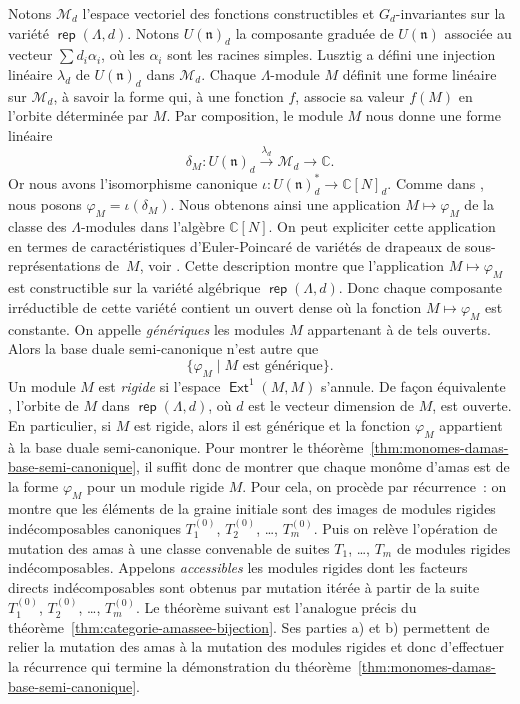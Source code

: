 \documentclass[brochure,12pt]{bourbaki}
\numberwithin{equation}{subsection}
\numberwithin{theorem}{section}
\newcommand{\opname}[1]{\operatorname{\mathsf{#1}}}
\newcommand{\rep}{\opname{rep}\nolimits}
\renewcommand{\rep}{\opname{rep}\nolimits}
\newcommand{\C}{\mathbb{C}}
\newcommand{\Ext}{\opname{Ext}}
\newcommand{\cm}{{\mathcal M}}
\renewcommand{\phi}{\varphi}
\newcommand{\arr}[1]{\stackrel{#1}{\rightarrow}}
\begin{document}
Notons $\cm_d$ l'espace vectoriel des fonctions constructibles et
$G_d$-invariantes sur la vari\'et\'e $\rep(\Lambda,d)$.  Notons
$U(\mathfrak{n})_d$ la composante gradu\'ee de $U(\mathfrak{n})$
associ\'ee au vecteur $\sum d_i \alpha_i$, o\`u les $\alpha_i$ sont
les racines simples.  Lusztig \cite{Lusztig00} a d\'efini une
injection lin\'eaire $\lambda_d$ de $U(\mathfrak{n})_d$ dans $\cm_d$.
Chaque $\Lambda$-module $M$ d\'efinit une forme lin\'eaire sur
$\cm_d$, \`a savoir la forme qui, \`a une fonction $f$, associe sa
valeur $f(M)$ en l'orbite d\'etermin\'ee par $M$. Par composition, le
module $M$ nous donne une forme lin\'eaire
\[
\delta_M: U(\mathfrak{n})_d \arr{\lambda_d} \cm_d \to \C.
\]
Or nous avons l'isomorphisme canonique $\iota : U(\mathfrak{n})_d^*
\to \C[N]_d$. Comme dans \cite{GeissLeclercSchroeer06}, nous posons
$\phi_M = \iota(\delta_M)$.  Nous obtenons ainsi une application
$M\mapsto \phi_M$ de la classe des $\Lambda$-modules dans l'alg\`ebre
$\C[N]$. On peut expliciter cette application en termes de
caract\'eristiques d'Euler-Poincar\'e de vari\'et\'es de drapeaux de
sous-repr\'esentations de~$M$, voir \cite{GeissLeclercSchroeer06}.
Cette description montre que l'application $M \mapsto \phi_M$ est
constructible sur la vari\'et\'e alg\'ebrique $\rep(\Lambda, d)$.
Donc chaque composante irr\'eductible de cette vari\'et\'e contient un
ouvert dense o\`u la fonction $M \mapsto \phi_M$ est
constante. On appelle {\em g\'en\'eriques} les modules $M$ appartenant
\`a de tels ouverts. Alors la base duale semi-canonique n'est autre que
\[
\{ \phi_M\; | \; \mbox{$M$ est g\'en\'erique} \}.
\]
Un module $M$ est {\em rigide} si l'espace $\Ext^1(M,M)$ s'annule. De fa\c{c}on
\'equivalente \cite{GeissLeclercSchroeer06}, l'orbite de $M$ dans $\rep(\Lambda,d)$,
o\`u $d$ est le vecteur dimension de $M$, est ouverte. En particulier, si $M$ est
rigide, alors il est g\'en\'erique et la fonction $\phi_M$ appartient \`a la base
duale semi-canonique. Pour montrer le th\'eor\`eme~\ref{thm:monomes-damas-base-semi-canonique},
il suffit donc de montrer que chaque mon\^ome d'amas est de la
forme $\phi_M$ pour un module rigide $M$. Pour cela, on proc\`ede par
r\'ecurrence~: on montre \cite{GeissLeclercSchroeer08b}
que les \'el\'ements de la graine initiale sont
des images de modules rigides ind\'ecomposables canoniques $T_1^{(0)}$,
$T_2^{(0)}$, \ldots, $T_m^{(0)}$. Puis on rel\`eve l'op\'eration de mutation
des amas \`a une classe convenable de suites $T_1$, \ldots, $T_m$ de modules
rigides ind\'ecomposables. Appelons {\em accessibles} les modules
rigides dont les facteurs directs ind\'ecomposables sont obtenus
par mutation it\'er\'ee \`a partir de la suite $T_1^{(0)}$,
$T_2^{(0)}$, \ldots, $T_m^{(0)}$. Le th\'eor\`eme suivant est
l'analogue pr\'ecis du th\'eor\`eme~\ref{thm:categorie-amassee-bijection}.
Ses parties a) et b) permettent
de relier la mutation des amas \`a la mutation des
modules rigides et donc d'effectuer la r\'ecurrence qui termine
la d\'emonstration du th\'eor\`eme~\ref{thm:monomes-damas-base-semi-canonique}.
\end{document}
